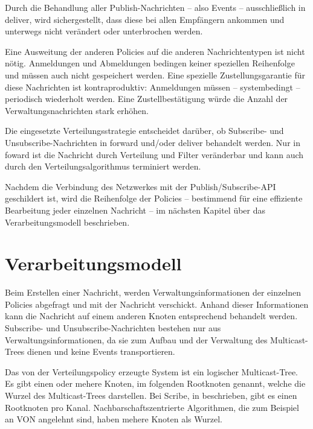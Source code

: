 Durch die Behandlung aller Publish-Nachrichten -- also Events -- ausschließlich in deliver, wird sichergestellt, dass diese bei allen Empfängern ankommen und unterwegs nicht verändert oder unterbrochen werden.

Eine Ausweitung der anderen Policies auf die anderen Nachrichtentypen ist nicht nötig. Anmeldungen und Abmeldungen bedingen keiner speziellen Reihenfolge und müssen auch nicht gespeichert werden. Eine spezielle Zustellungsgarantie für diese Nachrichten ist kontraproduktiv:  Anmeldungen müssen -- systembedingt -- periodisch wiederholt werden. Eine Zustellbestätigung würde die Anzahl der Verwaltungsnachrichten stark erhöhen.

Die eingesetzte Verteilungsstrategie entscheidet darüber, ob Subscribe- und Unsubscribe-Nachrichten in forward und/oder deliver behandelt werden. Nur in foward ist die Nachricht durch Verteilung und Filter veränderbar und kann auch durch den Verteilungsalgorithmus terminiert werden.


Nachdem die Verbindung des Netzwerkes mit der Publish/Subscribe-API geschildert ist, wird die Reihenfolge der Policies -- bestimmend für eine effiziente Bearbeitung jeder einzelnen Nachricht -- im nächsten Kapitel über das Verarbeitungsmodell beschrieben.

\section{Verarbeitungsmodell}
Beim Erstellen einer Nachricht, werden Verwaltungsinformationen der einzelnen Policies abgefragt und mit der Nachricht verschickt. Anhand dieser Informationen kann die Nachricht auf einem anderen Knoten entsprechend behandelt werden. Subscribe- und Unsubscribe-Nachrichten bestehen nur aus Verwaltungsinformationen, da sie zum Aufbau und der Verwaltung des Multicast-Trees dienen und keine Events transportieren.

Das von der Verteilungspolicy erzeugte System ist ein logischer Multicast-Tree. Es gibt einen oder mehere Knoten, im folgenden Rootknoten genannt, welche die Wurzel des Multicast-Trees darstellen. Bei Scribe, in  beschrieben, gibt es einen Rootknoten pro Kanal. Nachbarschaftszentrierte Algorithmen, die zum Beispiel an VON \cite{Hu2006VON} angelehnt sind, haben mehere Knoten als Wurzel. 


